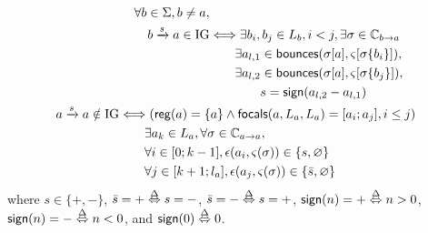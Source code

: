 \begin{definition}\label{def:inference-IG}
\begin{align}
\begin{split}
\forall b\in\Sigma, b\neq a, \\
b\xrightarrow s a \in \mathrm{IG} & \Longleftrightarrow
	\exists b_i,b_j\in L_b, i < j, \exists \sigma\in\mathbb C_{b\rightarrow a} \\
& \qquad
	\exists a_{l,1}\in\mathsf{bounces}(\sigma[a],\varsigma[\sigma\{b_i\}]), \\
& \qquad
	\exists a_{l,2}\in\mathsf{bounces}(\sigma[a],\varsigma[\sigma\{b_j\}]), \\
& \qquad\qquad
			s = \mathsf{sign}(a_{l,2} - a_{l,1})
\end{split}
\label{eq:IG-inference-b}
\\
\begin{split}
a \xrightarrow s a \notin\mathrm{IG} & \Longleftrightarrow
(\mathsf{reg}({a}) = \{a\} \wedge \mathsf{focals}(a, L_a, L_a) = [a_i;a_j], i\leq j) \\
& \qquad \exists a_k \in L_a, \forall \sigma\in\mathbb C_{a\rightarrow a}, \\
& \qquad \forall i \in [0;k-1], \epsilon(a_i, \varsigma(\sigma))\in \{s,\varnothing\} \\
& \qquad \forall j \in [k+1;l_a], \epsilon(a_j, \varsigma(\sigma))\in \{\bar s,\varnothing\}
\end{split}
\end{align}
where $s \in \{ +, - \}$, $\bar s = + \stackrel{\Delta}\Leftrightarrow s = -$, $\bar s = - \stackrel{\Delta}\Leftrightarrow s = +$,
$\mathsf{sign}(n) = + \stackrel{\Delta}\Leftrightarrow n > 0$,
$\mathsf{sign}(n) = - \stackrel{\Delta}\Leftrightarrow n < 0$,
and $\mathsf{sign}(0) \stackrel{\Delta}\Leftrightarrow 0$.
\end{definition}






